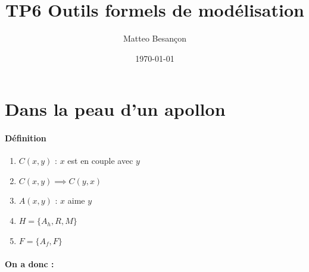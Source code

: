 \documentclass[12pt,a4paper,oneside]{article}
\author{Matteo Besançon}
\title {TP6 Outils formels de modélisation}
\date{\today}
\begin{document}
	\maketitle
	\setcounter{section}{1}
	\section{Dans la peau d’un apollon}
		\paragraph{Définition}

		\begin{enumerate}
			\item $C(x, y)$ : $x$ est en couple avec $y$
			\item $C(x, y) \implies C(y, x)$
			\item $A(x, y)$ : $x$ aime $y$
			\item $H = \{A_{h}, R, M\}$
			\item $F = \{A_{f}, F \}$
		\end{enumerate}

		\paragraph{On a donc :}
\end{document}
